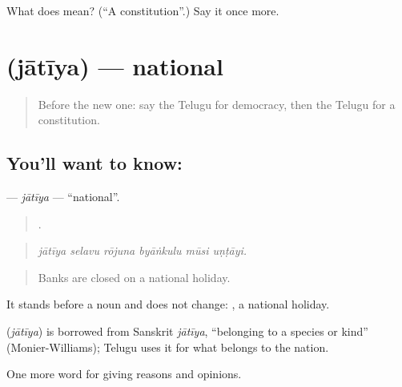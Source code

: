 \begin{tcolorbox}[breakable,colback=teal!4,colframe=teal!35!black,title={Before you move on}]
What does  mean? (\textquotedblleft{}A constitution\textquotedblright{}.) Say it once more.
\end{tcolorbox}
\section[\texorpdfstring{\te{జాతీయ} (jātīya)}{జాతీయ (jātīya)}]{ (jātīya) — national}

\label{lesson:TE-C401-jatiya}



\begin{quote}
Before the new one: say the Telugu for democracy, then the Telugu for a constitution.
\end{quote}

\subsection*{You'll want to know: }
\textbf{} — \emph{jātīya} — \textquotedblleft{}national\textquotedblright{}.

\begin{quote}
     .
\end{quote}

\begin{quote}
\emph{jātīya selavu rōjuna byāṅkulu mūsi uṇṭāyi.}
\end{quote}

\begin{quote}
Banks are closed on a national holiday.
\end{quote}

It stands before a noun and does not change:  , a national holiday.

\begin{cousinweb}
\textbf{} (\emph{jātīya}) is borrowed from Sanskrit \emph{jātīya}, \textquotedblleft{}belonging to a species or kind\textquotedblright{} (Monier-Williams); Telugu uses it for what belongs to the nation.
\end{cousinweb}

\begin{grammarlens}[title={What you've built}]
One more word for giving reasons and opinions.
\end{grammarlens}

